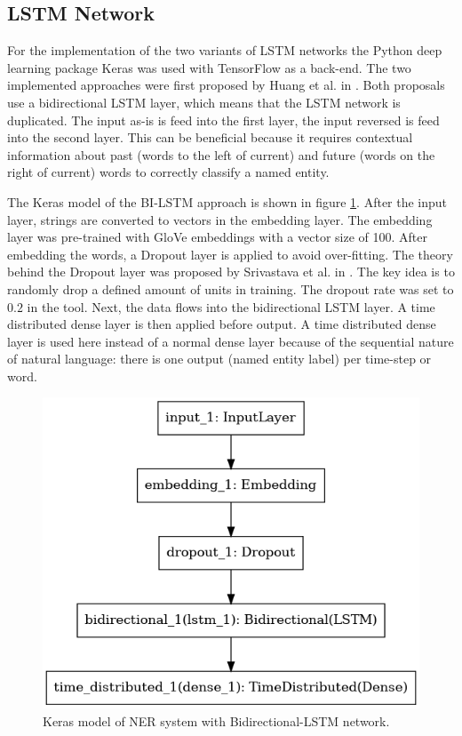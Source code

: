 \documentclass[12pt]{book}
\begin{document}
	\subsection{LSTM Network}
	\label{sub:lstm}
	
	For the implementation of the two variants of LSTM networks the Python deep learning package Keras \cite{keras} was used with TensorFlow \cite{tensorflow} as a back-end. The two implemented approaches were first proposed by Huang et al. in \cite{huang2015bidirectional}. Both proposals use a bidirectional LSTM layer, which means that the LSTM network is duplicated. The input as-is is feed into the first layer, the input reversed is feed into the second layer. This can be beneficial because it requires contextual information about past (words to the left of current) and future (words on the right of current) words to correctly classify a named entity.
	
	The Keras model of the BI-LSTM approach is shown in figure \ref{fig:lstm}. After the input layer, strings are converted to vectors in the embedding layer. The embedding layer was pre-trained with GloVe \cite{glove} embeddings with a vector size of 100. After embedding the words, a Dropout layer is applied to avoid over-fitting. The theory behind the Dropout layer was proposed by Srivastava et al. in \cite{srivastava2014dropout}. The key idea is to randomly drop a defined amount of units in training. The dropout rate was set to $0.2$ in the tool. Next, the data flows into the bidirectional LSTM layer. A time distributed dense layer is then applied before output. A time distributed dense layer is used here instead of a normal dense layer because of the sequential nature of natural language: there is one output (named entity label) per time-step or word.

	\begin{figure}
		\begin{center}
			\includegraphics[width=0.4\linewidth]{img/lstm_model.png}
		\end{center}
		\caption{Keras model of NER system with Bidirectional-LSTM network.}
		\label{fig:lstm}
	\end{figure}
\end{document}
